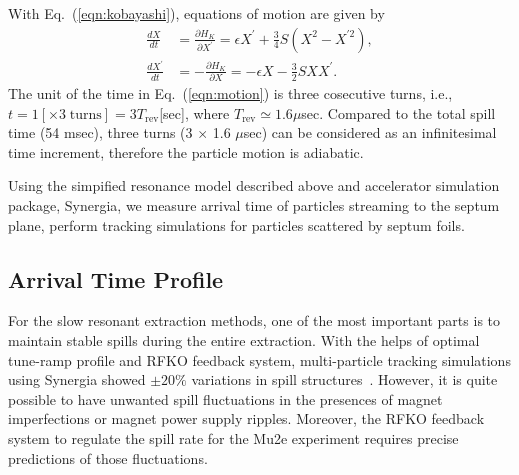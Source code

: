 \documentclass[aps,prstab,onecolumn,preprint,endfloats,11pt]{revtex4-1}
\begin{document}
With Eq.~(\ref{eqn:kobayashi}), equations of motion are given by
\begin{equation}
 \begin{split}
  \frac{dX}{dt} & = \frac{\partial H_{K}}{\partial X^{\prime}}
                  = \epsilon X^{\prime} + \frac{3}{4} S
                    \left(
                      X^{2} - X^{\prime 2}
                    \right), \\
  \frac{dX^{\prime}}{dt} & = - \frac{\partial H_{K}}{\partial X}
                           = - \epsilon X - \frac{3}{2} S X X^{\prime}.
 \end{split}
\label{eqn:motion}
\end{equation}
The unit of the time in Eq.~(\ref{eqn:motion}) is three cosecutive turns, i.e., $t = 1 [\times 3 \; \text{turns}] = 3 T_{\text{rev}}$[sec], where $T_{\text{rev}} \simeq 1.6 \mu$sec.
Compared to the total spill time (54 msec), three turns (3 $\times$ 1.6 $\mu$sec) can be considered as an infinitesimal time increment, therefore the particle motion is adiabatic. 

Using the simpified resonance model described above and accelerator simulation package, Synergia, we measure arrival time of particles streaming to the septum plane, perform tracking simulations for particles scattered by septum foils.

\subsection{\label{sec:arrival}Arrival Time Profile}

For the slow resonant extraction methods, one of the most important parts is to 
maintain stable spills during the entire extraction. With the helps of optimal 
tune-ramp profile and RFKO feedback system, multi-particle tracking simulations 
using Synergia showed \mbox{$\pm 20\%$} variations in spill 
structures~\cite{mu2e}. However, it is quite possible to have unwanted spill 
fluctuations in the presences of magnet imperfections or magnet power supply 
ripples. Moreover, the RFKO feedback system to regulate the spill rate for the 
Mu2e experiment requires precise predictions of those fluctuations. 
\end{document}

